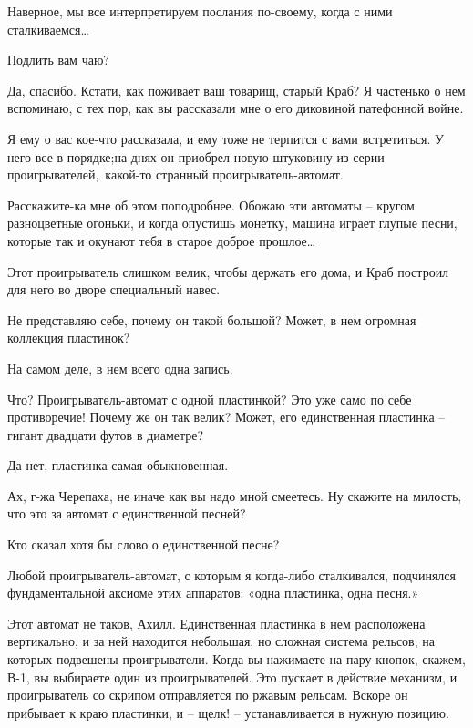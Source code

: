 \documentclass[../main.tex]{subfiles}
\begin{document}
\begin{dialogue}
 Наверное, мы все интерпретируем послания по-своему, когда с ними сталкиваемся\ldots{}


 Подлить вам чаю?

 Да, спасибо. Кстати, как поживает ваш товарищ, старый Краб? Я частенько о нем вспоминаю, с тех пор, как вы рассказали мне о его диковиной патефонной войне.

 Я ему о вас кое-что рассказала, и ему тоже не терпится с вами встретиться. У него все в порядке;на днях он приобрел новую штуковину из серии проигрывателей,~какой-то странный проигрыватель-автомат.

 Расскажите-ка мне об этом поподробнее. Обожаю эти автоматы \--- кругом разноцветные огоньки, и когда опустишь монетку, машина играет глупые песни, которые так и окунают тебя в старое доброе прошлое\ldots{}

 Этот проигрыватель слишком велик, чтобы держать его дома, и Краб построил для него во дворе специальный навес.

 Не представляю себе, почему он такой большой? Может, в нем огромная коллекция пластинок?

 На самом деле, в нем всего одна запись.

 Что? Проигрыватель-автомат с одной пластинкой? Это уже само по себе противоречие! Почему же он так велик? Может, его единственная пластинка \--- гигант двадцати футов в диаметре?

 Да нет, пластинка самая обыкновенная.

 Ах, г-жа Черепаха, не иначе как вы надо мной смеетесь. Ну скажите на милость, что это за автомат с единственной песней?

 Кто сказал хотя бы слово о единственной песне?

 Любой проигрыватель-автомат, с которым я когда-либо сталкивался, подчинялся фундаментальной аксиоме этих аппаратов: «одна пластинка, одна песня.»

 Этот автомат не таков, Ахилл. Единственная пластинка в нем расположена вертикально, и за ней находится небольшая, но сложная система рельсов, на которых подвешены проигрыватели. Когда вы нажимаете на пару кнопок, скажем, В-1, вы выбираете один из проигрывателей. Это пускает в действие механизм, и проигрыватель со скрипом отправляется по ржавым рельсам. Вскоре он прибывает к краю пластинки, и \--- щелк! \--- устанавливается в нужную позицию.


\end{dialogue}
\end{document}
